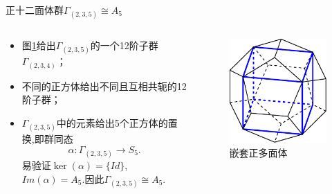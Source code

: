 \documentclass[pdf]{beamer}
\numberwithin{equation}{section}
\theoremstyle{plain}
\theoremstyle{plain}
\theoremstyle{remark}
\begin{document}
\begin{frame}{正十二面体群$\Gamma_{(2,3,5)} \cong A_5$}
\begin{columns}
	\begin{column}{0.7\textwidth}
		\begin{itemize}
			\item 图\ref{eg:fig1}给出$\Gamma_{(2,3,5)}$的一个12阶子群$\Gamma_{(2,3,4)}$；
			
			\item 不同的正方体给出不同且互相共轭的12阶子群；
			
			\item $\Gamma_{(2,3,5)}$中的元素给出5个正方体的置换,即群同态$$\alpha:\Gamma_{(2,3,5)}\longrightarrow S_5.$$
			易验证$\ker(\alpha)=\{Id\}$, $Im(\alpha)=A_5$.因此$\Gamma_{(2,3,5)}\cong A_5$.
			
		\end{itemize}
	\end{column}
	\begin{column}{0.3\textwidth}
		\begin{figure}[ht]
			\centering
			\includegraphics[scale=0.6]{poly/poly24.pdf}
			\caption{嵌套正多面体}
			\label{eg:fig1}
		\end{figure}
	\end{column}
\end{columns}
\end{frame}
\end{document}
